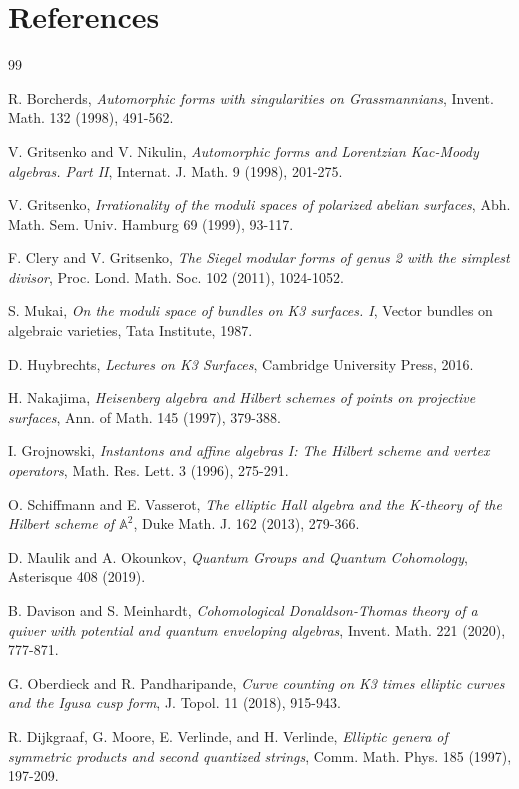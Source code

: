 \documentclass[11pt]{article}
\begin{document}
\section{References}
\label{sec:references}

\begin{thebibliography}{99}

R. Borcherds,
\emph{Automorphic forms with singularities on Grassmannians},
Invent. Math. 132 (1998), 491-562.

V. Gritsenko and V. Nikulin,
\emph{Automorphic forms and Lorentzian Kac-Moody algebras. Part II},
Internat. J. Math. 9 (1998), 201-275.

V. Gritsenko,
\emph{Irrationality of the moduli spaces of polarized abelian surfaces},
Abh. Math. Sem. Univ. Hamburg 69 (1999), 93-117.

F. Clery and V. Gritsenko,
\emph{The Siegel modular forms of genus 2 with the simplest divisor},
Proc. Lond. Math. Soc. 102 (2011), 1024-1052.

S. Mukai,
\emph{On the moduli space of bundles on K3 surfaces. I},
Vector bundles on algebraic varieties, Tata Institute, 1987.

D. Huybrechts,
\emph{Lectures on K3 Surfaces},
Cambridge University Press, 2016.

H. Nakajima,
\emph{Heisenberg algebra and Hilbert schemes of points on projective
surfaces},
Ann. of Math. 145 (1997), 379-388.

I. Grojnowski,
\emph{Instantons and affine algebras I: The Hilbert scheme and vertex
operators},
Math. Res. Lett. 3 (1996), 275-291.

O. Schiffmann and E. Vasserot,
\emph{The elliptic Hall algebra and the K-theory of the Hilbert scheme
of $\mathbb A^2$},
Duke Math. J. 162 (2013), 279-366.

D. Maulik and A. Okounkov,
\emph{Quantum Groups and Quantum Cohomology},
Asterisque 408 (2019).

B. Davison and S. Meinhardt,
\emph{Cohomological Donaldson-Thomas theory of a quiver with potential
and quantum enveloping algebras},
Invent. Math. 221 (2020), 777-871.

G. Oberdieck and R. Pandharipande,
\emph{Curve counting on K3 times elliptic curves and the Igusa cusp
form},
J. Topol. 11 (2018), 915-943.

R. Dijkgraaf, G. Moore, E. Verlinde, and H. Verlinde,
\emph{Elliptic genera of symmetric products and second quantized
strings},
Comm. Math. Phys. 185 (1997), 197-209.

\end{thebibliography}
\end{document}
